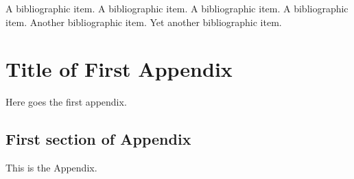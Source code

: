 \documentclass[12pt]{nuthesis}	%
\begin{document}

%

%


%
\begin{singlespace}
\clearpage{} %
\begin{thebibliography}{xxx}

 A bibliographic item.  A bibliographic item.  A
bibliographic item.  A bibliographic item.
 Another bibliographic item.  
 Yet another bibliographic item.  
\end{thebibliography}
\end{singlespace}

% 


\appendix		%


\chapter{Title of First Appendix} 	%

Here goes the first appendix.


\section{First section of Appendix}	%

This is the Appendix.
\end{document}

